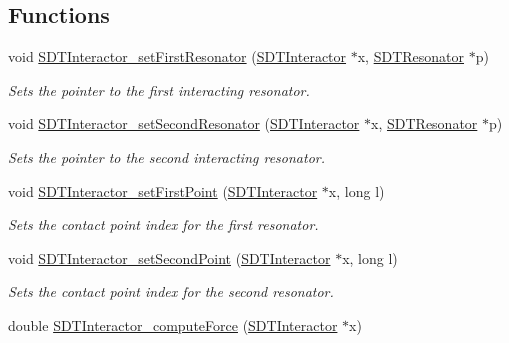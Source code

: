 \subsection*{Functions}
\begin{DoxyCompactItemize}
\item 
void \hyperlink{group__interactor_ga73c9ca147996c7ff9994ddc26ff19d00}{S\+D\+T\+Interactor\+\_\+set\+First\+Resonator} (\hyperlink{group__interactor_gacd68aba5c96532193d9cbc8dfa8f1c8c}{S\+D\+T\+Interactor} $\ast$x, \hyperlink{group__resonators_ga07d183de45e9713277c8f62d93d9be9c}{S\+D\+T\+Resonator} $\ast$p)
\begin{DoxyCompactList}\small\item\em Sets the pointer to the first interacting resonator. \end{DoxyCompactList}\item 
void \hyperlink{group__interactor_ga3f6b6eb1d662fb2770e3079beee4a19c}{S\+D\+T\+Interactor\+\_\+set\+Second\+Resonator} (\hyperlink{group__interactor_gacd68aba5c96532193d9cbc8dfa8f1c8c}{S\+D\+T\+Interactor} $\ast$x, \hyperlink{group__resonators_ga07d183de45e9713277c8f62d93d9be9c}{S\+D\+T\+Resonator} $\ast$p)
\begin{DoxyCompactList}\small\item\em Sets the pointer to the second interacting resonator. \end{DoxyCompactList}\item 
void \hyperlink{group__interactor_ga96b6bb2e7608f4ec80e569634758303c}{S\+D\+T\+Interactor\+\_\+set\+First\+Point} (\hyperlink{group__interactor_gacd68aba5c96532193d9cbc8dfa8f1c8c}{S\+D\+T\+Interactor} $\ast$x, long l)
\begin{DoxyCompactList}\small\item\em Sets the contact point index for the first resonator. \end{DoxyCompactList}\item 
void \hyperlink{group__interactor_ga0f55a3259e515011bc56039fe9d59277}{S\+D\+T\+Interactor\+\_\+set\+Second\+Point} (\hyperlink{group__interactor_gacd68aba5c96532193d9cbc8dfa8f1c8c}{S\+D\+T\+Interactor} $\ast$x, long l)
\begin{DoxyCompactList}\small\item\em Sets the contact point index for the second resonator. \end{DoxyCompactList}\item 
\hypertarget{group__interactor_ga2fe376e241510db2619051e5d7b0ffa6}{}double \hyperlink{group__interactor_ga2fe376e241510db2619051e5d7b0ffa6}{S\+D\+T\+Interactor\+\_\+compute\+Force} (\hyperlink{group__interactor_gacd68aba5c96532193d9cbc8dfa8f1c8c}{S\+D\+T\+Interactor} $\ast$x)\label{group__interactor_ga2fe376e241510db2619051e5d7b0ffa6}


\end{DoxyCompactItemize}
